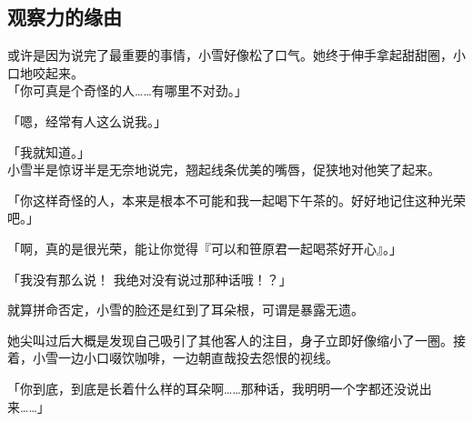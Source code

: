 \subsection{观察力的缘由}

或许是因为说完了最重要的事情，小雪好像松了口气。她终于伸手拿起甜甜圈，小口地咬起来。\\

「你可真是个奇怪的人……有哪里不对劲。」

「嗯，经常有人这么说我。」

「我就知道。」\\

小雪半是惊讶半是无奈地说完，翘起线条优美的嘴唇，促狭地对他笑了起来。

「你这样奇怪的人，本来是根本不可能和我一起喝下午茶的。好好地记住这种光荣吧。」

「啊，真的是很光荣，能让你觉得『可以和笹原君一起喝茶好开心』。」

「我没有那么说！ 我绝对没有说过那种话哦！？」

就算拼命否定，小雪的脸还是红到了耳朵根，可谓是暴露无遗。

她尖叫过后大概是发现自己吸引了其他客人的注目，身子立即好像缩小了一圈。接着，小雪一边小口啜饮咖啡，一边朝直哉投去怨恨的视线。

「你到底，到底是长着什么样的耳朵啊……那种话，我明明一个字都还没说出来……」

